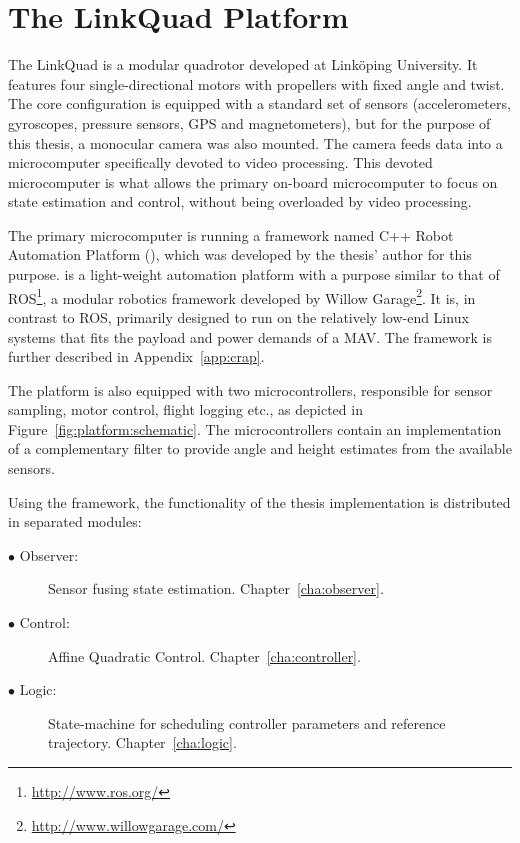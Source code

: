 \section{The LinkQuad Platform}
    The LinkQuad is a modular quadrotor developed at Linköping University.
    It features four single-directional motors with propellers with fixed angle and twist.
    The core configuration is equipped with a standard set of sensors
    (accelerometers, gyroscopes, pressure sensors, GPS and magnetometers),
    but for the purpose of this thesis, a monocular camera was also mounted.
    The camera feeds data into a microcomputer specifically devoted to video processing.
    This devoted microcomputer is what allows the primary on-board microcomputer
    to focus on state estimation and control, without being overloaded by
    video processing.

    The primary microcomputer is running a framework named C++ Robot Automation Platform (\crap),
    which was developed by the thesis' author for this purpose. \crap is a light-weight
    automation platform with a purpose similar to that of ROS\footnote{\url{http://www.ros.org/}}, a
    modular robotics framework developed by Willow Garage\footnote{\url{http://www.willowgarage.com/}}.
    It is, in contrast to ROS, primarily designed to run on the relatively low-end Linux systems
    that fits the payload and power demands of a MAV. The framework is further
    described in Appendix~\ref{app:crap}.

    The platform is also equipped with two microcontrollers, responsible
    for sensor sampling, motor control, flight logging etc., as depicted in
    Figure~\ref{fig:platform:schematic}. The microcontrollers contain
    an implementation of a complementary filter to provide angle and
    height estimates from the available sensors.

    Using the \crap framework, the functionality of the thesis implementation is
    distributed in separated modules:
    \begin{description}
        \item[$\bullet$ Observer:] Sensor fusing state estimation. Chapter~\ref{cha:observer}.
        \item[$\bullet$ Control:]  Affine Quadratic Control. Chapter~\ref{cha:controller}.
        \item[$\bullet$ Logic:]    State-machine for scheduling controller parameters and reference trajectory. Chapter~\ref{cha:logic}.
    \end{description}


